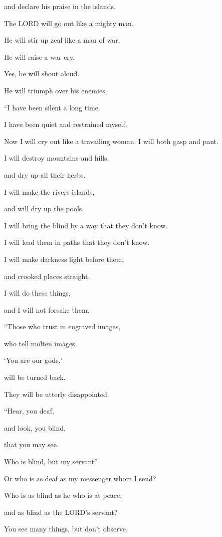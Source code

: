 and declare his praise in the islands.

\myverse{}The LORD will go out like a mighty man.

He will stir up zeal like a man of war.

He will raise a war cry.

Yes, he will shout aloud.

He will triumph over his enemies.


\vspace{\baselineskip} \myverse{}“I have been silent a long time.

I have been quiet and restrained myself.

Now I will cry out like a travailing woman. I will both gasp and pant.

\myverse{}I will destroy mountains and hills,

and dry up all their herbs.

I will make the rivers islands,

and will dry up the pools.

\myverse{}I will bring the blind by a way that they don’t know.

I will lead them in paths that they don’t know.

I will make darkness light before them,

and crooked places straight.

I will do these things,

and I will not forsake them.


\vspace{\baselineskip} \myverse{}“Those who trust in engraved images,

who tell molten images,

‘You are our gods,’

will be turned back.

They will be utterly disappointed.


\vspace{\baselineskip} \myverse{}“Hear, you deaf,

and look, you blind,

that you may see.

\myverse{}Who is blind, but my servant?

Or who is as deaf as my messenger whom I send?

Who is as blind as he who is at peace,

and as blind as the LORD’s servant?

\myverse{}You see many things, but don’t observe.

